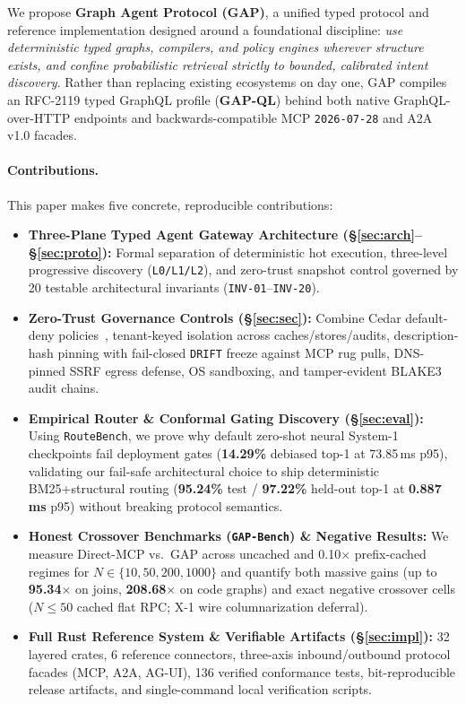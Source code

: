 \documentclass[10pt,twocolumn]{article}
\begin{document}
We propose \textbf{Graph Agent Protocol (GAP)}, a unified typed protocol and reference implementation designed around a foundational discipline: \emph{use deterministic typed graphs, compilers, and policy engines wherever structure exists, and confine probabilistic retrieval strictly to bounded, calibrated intent discovery}. Rather than replacing existing ecosystems on day one, GAP compiles an RFC-2119 typed GraphQL profile (\textbf{GAP-QL}) behind both native GraphQL-over-HTTP endpoints and backwards-compatible MCP \texttt{2026-07-28} and A2A v1.0 facades.

\paragraph{Contributions.} This paper makes five concrete, reproducible contributions:
\begin{itemize}
  \item \textbf{Three-Plane Typed Agent Gateway Architecture (\S\ref{sec:arch}--\S\ref{sec:proto}):} Formal separation of deterministic hot execution, three-level progressive discovery (\texttt{L0/L1/L2}), and zero-trust snapshot control governed by 20 testable architectural invariants (\texttt{INV-01}--\texttt{INV-20}).
  \item \textbf{Zero-Trust Governance Controls (\S\ref{sec:sec}):} Combine Cedar default-deny policies~\cite{cutler2024cedar}, tenant-keyed isolation across caches/stores/audits, description-hash pinning with fail-closed \texttt{DRIFT} freeze against MCP rug pulls, DNS-pinned SSRF egress defense, OS sandboxing, and tamper-evident BLAKE3 audit chains.
  \item \textbf{Empirical Router \& Conformal Gating Discovery (\S\ref{sec:eval}):} Using \texttt{RouteBench}, we prove why default zero-shot neural System-1 checkpoints fail deployment gates (\textbf{14.29\%} debiased top-1 at 73.85\,ms p95), validating our fail-safe architectural choice to ship deterministic BM25+structural routing (\textbf{95.24\%} test / \textbf{97.22\%} held-out top-1 at \textbf{0.887\,ms} p95) without breaking protocol semantics.
  \item \textbf{Honest Crossover Benchmarks (\texttt{GAP-Bench}) \& Negative Results:} We measure Direct-MCP vs.\ GAP across uncached and 0.10$\times$ prefix-cached regimes for $N \in \{10, 50, 200, 1000\}$ and quantify both massive gains (up to \textbf{95.34$\times$} on joins, \textbf{208.68$\times$} on code graphs) and exact negative crossover cells ($N \le 50$ cached flat RPC; X-1 wire columnarization deferral).
  \item \textbf{Full Rust Reference System \& Verifiable Artifacts (\S\ref{sec:impl}):} 32 layered crates, 6 reference connectors, three-axis inbound/outbound protocol facades (MCP, A2A, AG-UI), 136 verified conformance tests, bit-reproducible release artifacts, and single-command local verification scripts.
\end{itemize}
\end{document}
